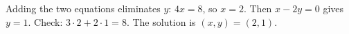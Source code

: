 Adding the two equations eliminates $y$: $4x=8$, so $x=2$. Then $x-2y=0$ gives $y=1$. Check: $3\cdot2+2\cdot1=8$. The solution is $\boxed{(x,y)=(2,1)}$.
